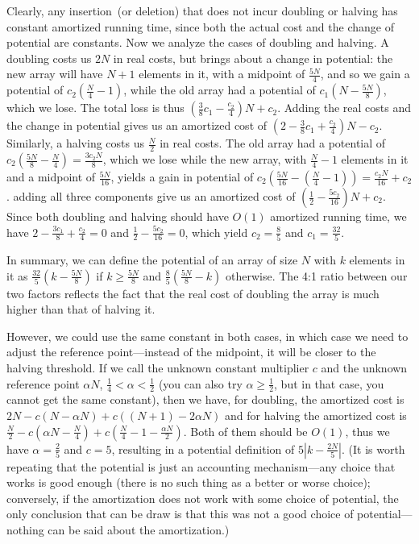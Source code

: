 \documentclass[11pt]{article}
\begin{document}
Clearly, any insertion~(or deletion) that does not incur doubling or halving
has constant amortized running time, since both the actual cost and
the change of potential are constants. Now we analyze the cases of doubling and halving.
A doubling costs us $2N$ in real costs, but brings about a change in
potential: the new array will have $N+1$ elements in it, with a midpoint of
$\frac{5N}{4}$, and so we gain a potential of $c_2(\frac{N}{4}-1)$, while
the old array had a potential of $c_1(N-\frac{5N}{8})$, which we lose.  The
total loss is thus $(\frac{3}{8}c_1 - \frac{c_2}{4}) N + c_2$.
Adding the real costs and the change in potential gives us an amortized cost of
$(2 - \frac{3}{8}c_1 + \frac{c_2}{4}) N - c_2$.
Similarly, a halving costs us $\frac{N}{2}$ in real costs. The old array had a
potential of $c_2(\frac{5N}{8}-\frac{N}{4})=\frac{3c_2N}{8}$, which
we lose while the new array, with $\frac{N}{4}-1$ elements in it and a midpoint
of $\frac{5N}{16}$, yields a gain in potential of
$c_2(\frac{5N}{16} - (\frac{N}{4}-1))=\frac{c_2N}{16} + c_2$.
adding all three components give us an amortized cost of
$(\frac{1}{2} - \frac{5c_2}{16})N + c_2$.
Since both doubling and halving should have $O(1)$ amortized running time,
we have  $2-\frac{3c_1}{8}+\frac{c_2}{4}=0$ and
$\frac{1}{2} - \frac{5c_2}{16} = 0$,
	which yield $c_2 = \frac{8}{5}$ and $c_1 = \frac{32}{5}$.

In summary, we can define the potential of an array of size $N$ with $k$
elements in it as
$\frac{32}{5}(k-\frac{5N}{8})$ if $k\geq\frac{5N}{8}$ and
$\frac{8}{5}(\frac{5N}{8} - k)$ otherwise.
The 4:1 ratio between our two factors reflects the fact that the real cost
of doubling the array is much higher than that of halving it.

However, we could use the same constant in both cases, in which case we need to
adjust the reference point---instead of the midpoint, it will be closer to the
halving threshold.  If we call the unknown constant multiplier $c$ and the
unknown reference point $\alpha N$, $\frac{1}{4} < \alpha < \frac{1}{2}$ (you
can also try $\alpha \ge \frac{1}{2}$, but in that case, you cannot get the
same constant), then we have, for doubling, the amortized cost is
$2N-c(N-\alpha N)+c((N+1) - 2\alpha N)$ and for halving the amortized cost is
$\frac{N}{2}-c(\alpha N - \frac{N}{4})+c(\frac{N}{4} - 1 - \frac{\alpha
N}{2})$.  Both of them should be $O(1)$, thus we have $\alpha=\frac{2}{5}$
and $c=5$, resulting in a potential definition of $5|k-\frac{2N}{5}|$.
(It is worth repeating that the potential is just an accounting mechanism---any
choice that works is good enough (there is no such thing as a better or worse
choice); conversely, if the amortization does not work with some choice of
potential, the only conclusion that can be draw is that this was not a good
choice of potential---nothing can be said about the amortization.)
\end{document}
